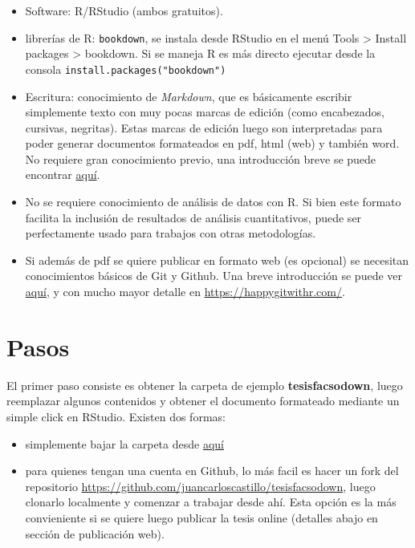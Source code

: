 \documentclass[12pt,twoside]{templates/facsothesis}
\providecommand{\tightlist}{%
  \setlength{\itemsep}{0pt}\setlength{\parskip}{0pt}}
\begin{document}
\begin{itemize}
\item
  Software: R/RStudio (ambos gratuitos).
\item
  librerías de R: \texttt{bookdown}, se instala desde RStudio en el menú Tools \textgreater{} Install packages \textgreater{} bookdown. Si se maneja R es más directo ejecutar desde la consola \texttt{install.packages("bookdown")}
\item
  Escritura: conocimiento de \emph{Markdown}, que es básicamente escribir simplemente texto con muy pocas marcas de edición (como encabezados, cursivas, negritas). Estas marcas de edición luego son interpretadas para poder generar documentos formateados en pdf, html (web) y también word. No requiere gran conocimiento previo, una introducción breve se puede encontrar \href{https://juancarloscastillo.github.io/in-socabi/lenguaje-reproducible.html}{aquí}.
\item
  No se requiere conocimiento de análisis de datos con R. Si bien este formato facilita la inclusión de resultados de análisis cuantitativos, puede ser perfectamente usado para trabajos con otras metodologías.
\item
  Si además de pdf se quiere publicar en formato web (es opcional) se necesitan conocimientos básicos de Git y Github. Una breve introducción se puede ver \href{https://cienciasocialabierta.netlify.app/class/08-class/}{aquí}, y con mucho mayor detalle en \url{https://happygitwithr.com/}.
\end{itemize}

\hypertarget{pasos}{%
\section{Pasos}\label{pasos}}

El primer paso consiste es obtener la carpeta de ejemplo \textbf{tesisfacsodown}, luego reemplazar algunos contenidos y obtener el documento formateado mediante un simple click en RStudio. Existen dos formas:

\begin{itemize}
\tightlist
\item
  simplemente bajar la carpeta desde \href{}{aquí}
\item
  para quienes tengan una cuenta en Github, lo más facil es hacer un fork del repositorio \url{https://github.com/juancarloscastillo/tesisfacsodown}, luego clonarlo localmente y comenzar a trabajar desde ahí. Esta opción es la más convieniente si se quiere luego publicar la tesis online (detalles abajo en sección de publicación web).
\end{itemize}
\end{document}
